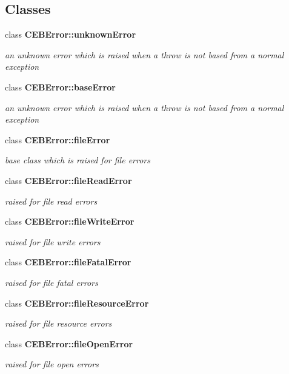 \subsection*{Classes}
\begin{DoxyCompactItemize}
\item 
class {\bf C\-E\-B\-Error\-::unknown\-Error}
\begin{DoxyCompactList}\small\item\em an unknown error which is raised when a throw is not based from a normal exception \end{DoxyCompactList}\item 
class {\bf C\-E\-B\-Error\-::base\-Error}
\begin{DoxyCompactList}\small\item\em an unknown error which is raised when a throw is not based from a normal exception \end{DoxyCompactList}\item 
class {\bf C\-E\-B\-Error\-::file\-Error}
\begin{DoxyCompactList}\small\item\em base class which is raised for file errors \end{DoxyCompactList}\item 
class {\bf C\-E\-B\-Error\-::file\-Read\-Error}
\begin{DoxyCompactList}\small\item\em raised for file read errors \end{DoxyCompactList}\item 
class {\bf C\-E\-B\-Error\-::file\-Write\-Error}
\begin{DoxyCompactList}\small\item\em raised for file write errors \end{DoxyCompactList}\item 
class {\bf C\-E\-B\-Error\-::file\-Fatal\-Error}
\begin{DoxyCompactList}\small\item\em raised for file fatal errors \end{DoxyCompactList}\item 
class {\bf C\-E\-B\-Error\-::file\-Resource\-Error}
\begin{DoxyCompactList}\small\item\em raised for file resource errors \end{DoxyCompactList}\item 
class {\bf C\-E\-B\-Error\-::file\-Open\-Error}
\begin{DoxyCompactList}\small\item\em raised for file open errors \end{DoxyCompactList}\item 

\end{DoxyCompactItemize}

